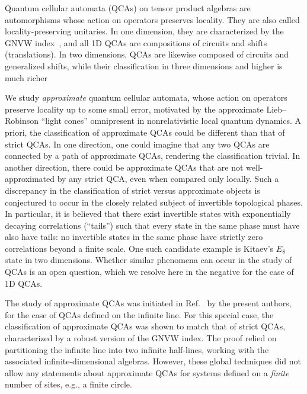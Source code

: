 \documentclass[11pt,reqno]{amsart}
\theoremstyle{definition}
\theoremstyle{remark}
\numberwithin{equation}{section}
\begin{document}
Quantum cellular automata (QCAs) on tensor product algebras are automorphisms whose action on operators preserves locality.
They are also called locality-preserving unitaries.
In one dimension, they are characterized by the GNVW index~\cite{gross2012index}, and all 1D QCAs are compositions of circuits and shifts (translations).
In two dimensions, QCAs are likewise composed of circuits and generalized shifts, while their classification in three dimensions and higher is much richer \cite{freedman2020classification,shirley2022three,haah2023nontrivial,haah2023invertible,fidkowski2025quantum,haah2025topological,jones2024quantum,sun2025clifford} 

We study \emph{approximate} quantum cellular automata, whose action on operators preserve locality up to some small error, motivated by the approximate Lieb--Robinson ``light cones'' omnipresent in nonrelativistic local quantum dynamics.
A priori, the classification of approximate QCAs could be different than that of strict QCAs.
In one direction, one could imagine that any two QCAs are connected by a path of approximate QCAs, rendering the classification trivial.
In another direction, there could be approximate QCAs that are not well-approximated by any strict QCA, even when compared only locally.
Such a discrepancy in the classification of strict versus approximate objects is conjectured to occur in the closely related subject of invertible topological phases.
In particular, it is believed that there exist invertible states with exponentially decaying correlations (``tails'') such that every state in the same phase must have also have tails: no invertible states in the same phase have strictly zero correlations beyond a finite scale.
One such candidate example is Kitaev's $E_8$ state in two dimensions.
Whether similar phenomena can occur in the study of QCAs is an open question, which we resolve here in the negative for the case of 1D QCAs.

The study of approximate QCAs was initiated in Ref.~\cite{ranard2022converse} by the present authors, for the case of QCAs defined on the infinite line.
For this special case, the classification of approximate QCAs was shown to match that of strict QCAs, characterized by a robust version of the GNVW index.
The proof relied on partitioning the infinite line into two infinite half-lines, working with the associated infinite-dimensional algebras.
However, these global techniques did not allow any statements about approximate QCAs for systems defined on a \textit{finite} number of sites, e.g., a finite circle.
\end{document}
